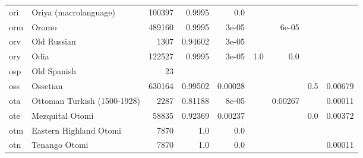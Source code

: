 \documentclass[11pt]{article}
\begin{document}
\begin{table*}[h]
{\begin{tabular}{llrrrrrrr}
ori         & Oriya (macrolanguage)         & 100397         & 0.9995         & 0.0         &          &          &          &          \\

orm         & Oromo         & 489160         & 0.9995         & 3e-05         &          & 6e-05         &          &          \\

orv         & Old Russian         & 1307         & 0.94602         & 3e-05         &          &          &          &          \\

ory         & Odia         & 122527         & 0.9995         & 3e-05         & 1.0         & 0.0         &          &          \\

osp         & Old Spanish         & 23         &          &          &          &          &          &          \\

oss         & Ossetian         & 630164         & 0.99502         & 0.00028         &          &          & 0.5         & 0.00679         \\

ota         & Ottoman Turkish (1500-1928)         & 2287         & 0.81188         & 8e-05         &          & 0.00267         &          & 0.00011         \\

ote         & Mezquital Otomi         & 58835         & 0.92369         & 0.00237         &          &          & 0.0         & 0.00372         \\

otm         & Eastern Highland Otomi         & 7870         & 1.0         & 0.0         &          &          &          &          \\

otn         & Tenango Otomi         & 7870         & 1.0         & 0.0         &          &          &          & 0.00011         \\


\end{tabular}}
\end{table*}
\end{document}
